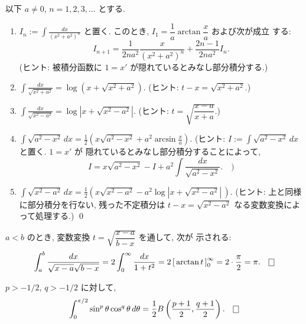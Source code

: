 \documentclass[12pt,twoside]{jarticle}
\begin{document}
\begin{question}[不定積分の計算]
  以下 $a\ne0$, $n=1,2,3,\ldots$ とする.
  \begin{enumerate}
  \item $\displaystyle I_n := \int\frac{dx}{(x^2+a^2)^n}$ と置く.
    このとき, $I_1 = \dfrac{1}{a} \arctan \dfrac{x}{a}$ および次が成立
    する:
    \[
      I_{n+1}
      = \frac{1}{2na^2}\frac{x}{(x^2+a^2)^n} + \frac{2n-1}{2na^2} I_n.
    \] %
    (ヒント: 被積分函数に $1 = x'$ が隠れているとみなし部分積分する.)
  \item 
    \( \displaystyle
        \int \frac{dx}{\sqrt{x^2+a^2}}
      = \log(x + \sqrt{x^2+a^2}).
    \) %
    \quad (ヒント: $t - x = \sqrt{x^2+a^2}$.)
  \item 
    \( \displaystyle
      \int \frac{dx}{\sqrt{x^2-a^2}}
      = \log \left| x + \sqrt{x^2-a^2} \right|.
    \) %
    \quad (ヒント: $t = \sqrt{\dfrac{x-a}{x+a}}$.)
  \item 
    \( \displaystyle
      \int \sqrt{a^2-x^2}\,dx
      = \frac{1}{2}
        \left( x\sqrt{a^2-x^2} + a^2\arcsin\frac{x}{a} \right).
    \) %
    \quad (ヒント: $I := \int \sqrt{a^2-x^2}\,dx$ と置く. $1=x'$ が
    隠れているとみなし部分積分することによって, 
    \[
      I = x \sqrt{a^2-x^2} - I + a^2 \int \frac{dx}{\sqrt{a^2-x^2}}
      .\quad\text{)}
    \] %
  \item
    \( \displaystyle
        \int \sqrt{x^2 - a^2}\,dx
      = \frac{1}{2}
        \left( x\sqrt{x^2-a^2} 
               - a^2 \log \left|x + \sqrt{x^2-a^2}\right| \,\right).
    \) %
    \quad (ヒント: 上と同様に部分積分を行ない, 残った不定積分は %
    $t - x = \sqrt{x^2-a^2}$ なる変数変換によって処理する.)
    \qed
  \end{enumerate}
\end{question}


\begin{question}
  $a<b$ のとき, 変数変換 $t = \sqrt{\dfrac{x-a}{b-x}}$ を通して, 次が
  示される:
  \[
    \int_a^b \frac{dx}{\sqrt{x-a}\sqrt{b-x}}
    = 2 \int_0^\infty \frac{dx}{1+t^2}
    = 2 \left[\, \arctan t \,\right]_0^\infty
    = 2 \cdot \frac{\pi}{2}
    = \pi.
    \qed
  \]
\end{question}

\begin{question}
  $p > -1/2$, $q > -1/2$ に対して, 
  \[
    \int_0^{\pi/2} \sin^p \theta \cos^q \theta \,d\theta
    =
    \frac{1}{2} B\left( \frac{p+1}{2}, \frac{q+1}{2} \right).
  \qed
  \]
\end{question}
\end{document}
